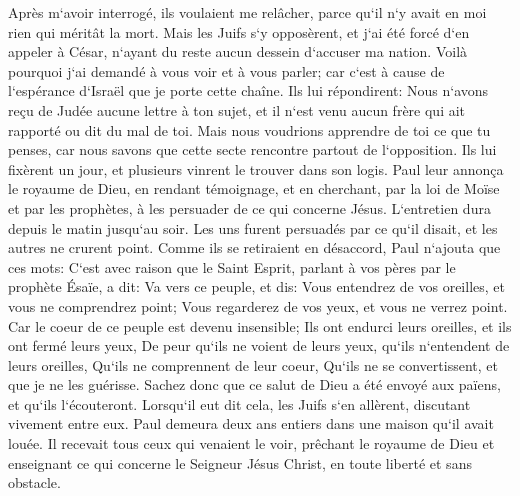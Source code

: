 \verse Après m`avoir interrogé, ils voulaient me relâcher, parce qu`il n`y avait en moi rien qui méritât la mort. 
\verse Mais les Juifs s`y opposèrent, et j`ai été forcé d`en appeler à César, n`ayant du reste aucun dessein d`accuser ma nation. 
\verse Voilà pourquoi j`ai demandé à vous voir et à vous parler; car c`est à cause de l`espérance d`Israël que je porte cette chaîne. 
\verse Ils lui répondirent: Nous n`avons reçu de Judée aucune lettre à ton sujet, et il n`est venu aucun frère qui ait rapporté ou dit du mal de toi. 
\verse Mais nous voudrions apprendre de toi ce que tu penses, car nous savons que cette secte rencontre partout de l`opposition. 
\verse Ils lui fixèrent un jour, et plusieurs vinrent le trouver dans son logis. Paul leur annonça le royaume de Dieu, en rendant témoignage, et en cherchant, par la loi de Moïse et par les prophètes, à les persuader de ce qui concerne Jésus. L`entretien dura depuis le matin jusqu`au soir. 
\verse Les uns furent persuadés par ce qu`il disait, et les autres ne crurent point. 
\verse Comme ils se retiraient en désaccord, Paul n`ajouta que ces mots: C`est avec raison que le Saint Esprit, parlant à vos pères par le prophète Ésaïe, a dit: 
\verse Va vers ce peuple, et dis: Vous entendrez de vos oreilles, et vous ne comprendrez point; Vous regarderez de vos yeux, et vous ne verrez point. 
\verse Car le coeur de ce peuple est devenu insensible; Ils ont endurci leurs oreilles, et ils ont fermé leurs yeux, De peur qu`ils ne voient de leurs yeux, qu`ils n`entendent de leurs oreilles, Qu`ils ne comprennent de leur coeur, Qu`ils ne se convertissent, et que je ne les guérisse. 
\verse Sachez donc que ce salut de Dieu a été envoyé aux païens, et qu`ils l`écouteront. 
\verse Lorsqu`il eut dit cela, les Juifs s`en allèrent, discutant vivement entre eux. 
\verse Paul demeura deux ans entiers dans une maison qu`il avait louée. Il recevait tous ceux qui venaient le voir, 
\verse prêchant le royaume de Dieu et enseignant ce qui concerne le Seigneur Jésus Christ, en toute liberté et sans obstacle. 
